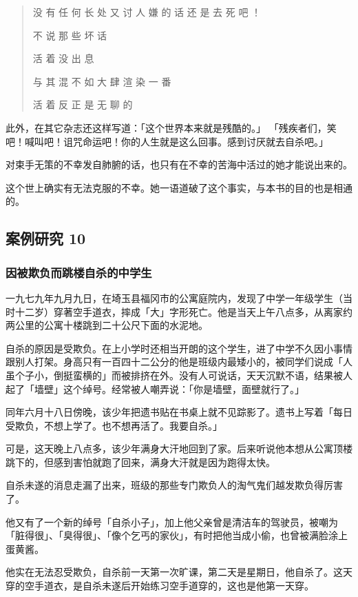 \documentclass[UTF8]{ctexart}
\begin{document}
\begin{verse}

没 有 任 何 长 处 又 讨 人 嫌 的 话 还 是 去 死 吧 ！

不 说 那 些 坏 话

活 着 没 出 息

与 其 混 不 如 大 肆 渲 染 一 番

活 着 反 正 是 无 聊 的
\end{verse}

此外，在其它杂志还这样写道：「这个世界本来就是残酷的。」
「残疾者们，笑吧！喊叫吧！诅咒命运吧！你的人生就是这么回事。感到讨厌就去自杀吧。」

对束手无策的不幸发自肺腑的话，也只有在不幸的苦海中活过的她才能说出来的。

这个世上确实有无法克服的不幸。她一语道破了这个事实，与本书的目的也是相通的。

\subsection{案例研究 10}
\subsubsection*{因被欺负而跳楼自杀的中学生}

一九七九年九月九日，在埼玉县福冈市的公寓庭院内，发现了中学一年级学生（当时十二岁）穿著空手道衣，摔成「大」字形死亡。他是当天上午八点多，从离家约两公里的公寓十楼跳到二十公尺下面的水泥地。

自杀的原因是受欺负。在上小学时还相当开朗的这个学生，进了中学不久因小事情跟别人打架。身高只有一百四十二公分的他是班级内最矮小的，被同学们说成「人虽个子小，倒挺蛮横的」而被排挤在外。没有人可说话，天天沉默不语，结果被人起了「墙壁」这个绰号。经常被人嘲弄说：「你是墙壁，面壁就行了。」

同年六月十八日傍晚，该少年把遗书贴在书桌上就不见踪影了。遗书上写着「每日受欺负，不想上学了。也不想再活了。我要自杀。」

可是，这天晚上八点多，该少年满身大汗地回到了家。后来听说他本想从公寓顶楼跳下的，但感到害怕就跑了回来，满身大汗就是因为跑得太快。

自杀未遂的消息走漏了出来，班级的那些专门欺负人的淘气鬼们越发欺负得厉害了。

他又有了一个新的绰号「自杀小子」，加上他父亲曾是清洁车的驾驶员，被嘲为「脏得很」、「臭得很」、「像个乞丐的家伙」，有时把他当成小偷，也曾被满脸涂上蛋黄酱。

他实在无法忍受欺负，自杀前一天第一次旷课，第二天是星期日，他自杀了。这天穿的空手道衣，是自杀未遂后开始练习空手道穿的，这也是他第一天穿。
\end{document}
